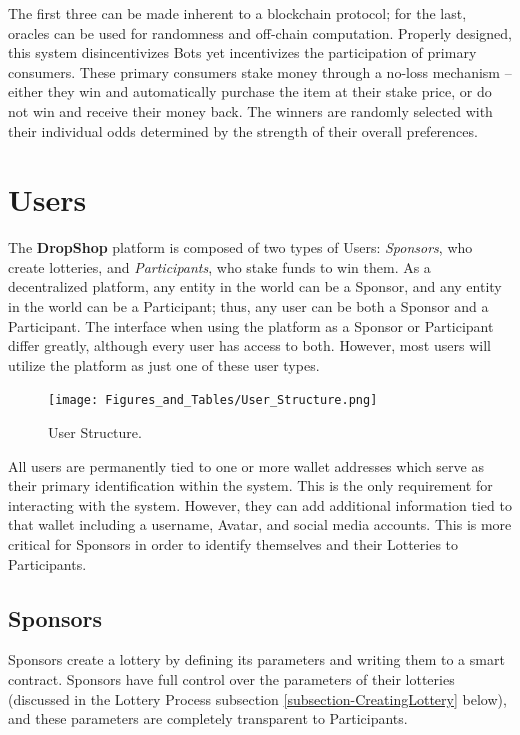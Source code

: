 \documentclass[runningheads]{llncs}
\begin{document}
The first three can be made inherent to a blockchain protocol; for the last, oracles can be used for randomness and off-chain computation.  Properly designed, this system disincentivizes Bots yet incentivizes the participation of primary consumers.  These primary consumers stake money through a no-loss mechanism – either they win and automatically purchase the item at their stake price, or do not win and receive their money back.  The winners are randomly selected with their individual odds determined by the strength of their overall preferences.


\section{Users}\label{section-Users}

The \textbf{DropShop} platform is composed of two types of Users: \emph{Sponsors}, who create lotteries, and \emph{Participants}, who stake funds to win them.  As a decentralized platform, any entity in the world can be a Sponsor, and any entity in the world can be a Participant; thus, any user can be both a Sponsor and a Participant.  The interface when using the platform as a Sponsor or Participant differ greatly, although every user has access to both.  However, most users will utilize the platform as just one of these user types.

\begin{figure}[H]
\centering
\texttt{[image: Figures\_and\_Tables/User\_Structure.png]}
\caption{User Structure.}
\end{figure}

All users are permanently tied to one or more wallet addresses which serve as their primary identification within the system.  This is the only requirement for interacting with the system. However, they can add additional information tied to that wallet including a username, Avatar, and social media accounts.  This is more critical for Sponsors in order to identify themselves and their Lotteries to Participants.

\subsection{Sponsors}\label{subsection-Sponsors}
Sponsors create a lottery by defining its parameters and writing them to a smart contract.  Sponsors have full control over the parameters of their lotteries (discussed in the Lottery Process subsection \ref{subsection-CreatingLottery} below), and these parameters are completely transparent to Participants.   
\end{document}
